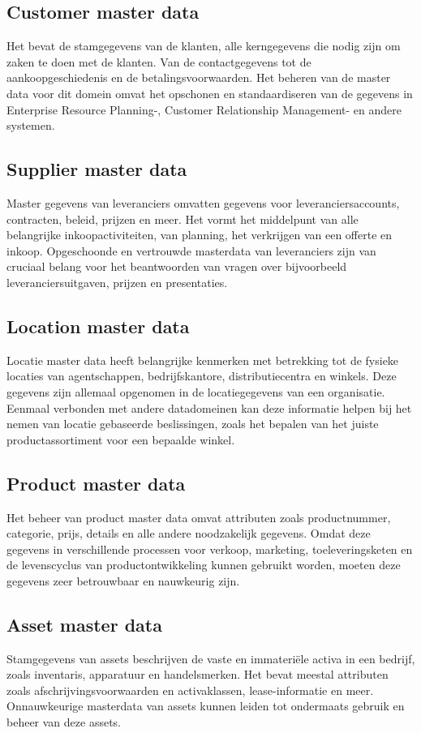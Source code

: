 \subsection{Customer master data}
Het bevat de stamgegevens van de klanten, alle kerngegevens die nodig zijn om zaken te doen met de klanten. Van de contactgegevens tot de aankoopgeschiedenis en de betalingsvoorwaarden. Het beheren van de master data voor dit domein omvat het opschonen en standaardiseren van de gegevens in Enterprise Resource Planning-, Customer Relationship Management- en andere systemen.

\subsection{Supplier master data}
Master gegevens van leveranciers omvatten gegevens voor leveranciersaccounts, contracten, beleid, prijzen en meer. Het vormt het middelpunt van alle belangrijke inkoopactiviteiten, van planning, het verkrijgen van een offerte en inkoop. Opgeschoonde en vertrouwde masterdata van leveranciers zijn van cruciaal belang voor het beantwoorden van vragen over bijvoorbeeld leveranciersuitgaven, prijzen en presentaties. 

\subsection{Location master data}
Locatie master data heeft belangrijke kenmerken met betrekking tot de fysieke locaties van agentschappen, bedrijfskantore, distributiecentra en winkels. Deze gegevens zijn allemaal opgenomen in de locatiegegevens van een organisatie. Eenmaal verbonden met andere datadomeinen kan deze informatie helpen bij het nemen van locatie gebaseerde beslissingen, zoals het bepalen van het juiste productassortiment voor een bepaalde winkel.

\subsection{Product master data}
Het beheer van product master data omvat attributen zoals productnummer, categorie, prijs, details en alle andere noodzakelijk gegevens. Omdat deze gegevens in verschillende processen voor verkoop, marketing, toeleveringsketen en de levenscyclus van productontwikkeling kunnen gebruikt worden, moeten deze gegevens zeer betrouwbaar en nauwkeurig zijn.

\subsection{Asset master data}
Stamgegevens van assets beschrijven de vaste en immateriële activa in een bedrijf, zoals inventaris, apparatuur en handelsmerken. Het bevat meestal attributen zoals afschrijvingsvoorwaarden en activaklassen, lease-informatie en meer. Onnauwkeurige masterdata van assets kunnen leiden tot ondermaats gebruik en beheer van deze assets.

